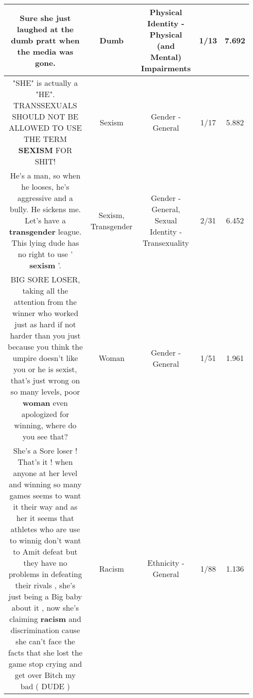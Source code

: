 \documentclass[11pt]{article}
\newlength\mylength
\begin{document}
\begin{center}
\begin{longtable}{|C{.65\mylength}|C{.30\mylength}|C{.12\mylength}|C{.12\mylength}|C{.12\mylength}|}
  \small Sure she just laughed at the \textbf{dumb} pratt when the media was gone.\normalsize   & Dumb & Physical Identity - Physical (and Mental) Impairments & 1/13 & 7.692 \\  \hline
  \small "SHE" is actually a "HE".   TRANSSEXUALS SHOULD NOT BE ALLOWED TO USE THE TERM \textbf{SEXISM} FOR SHIT!\normalsize   & Sexism & Gender - General & 1/17 & 5.882 \\  \hline
  \small He's a man, so when he looses, he's aggressive and a bully. He sickens me. Let's have a \textbf{transgender} league. This lying dude has no right to use ' \textbf{sexism} '.\normalsize   & Sexism, Transgender & Gender - General, Sexual Identity - Transexuality & 2/31 & 6.452 \\  \hline
  \small BIG SORE LOSER, taking all the attention from the winner who worked just as hard if not harder than you just because you think the umpire doesn't like you or he is sexist, that's just wrong on so many levels, poor \textbf{woman} even apologized for winning, where do you see that?\normalsize   & Woman & Gender - General & 1/51 & 1.961 \\  \hline
  \small She's a Sore loser ! That's it ! when anyone at her level and winning so many games seems to want it their way and as her it seems that athletes who are use to winnig don't want to Amit defeat but they have no problems in defeating their rivals , she's just being a Big baby about it , now she's claiming \textbf{racism} and discrimination cause she can't face the facts that she lost the game stop crying and get over Bitch my bad ( DUDE )\normalsize   & Racism & Ethnicity - General & 1/88 & 1.136 \\  \hline

\end{longtable}
\end{center}
\end{document}
